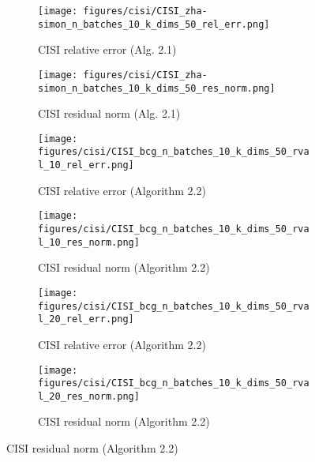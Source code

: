 
\begin{figure}[H]
  \centering
  \begin{subfigure}[b]{0.48\textwidth}
    \centering
    \texttt{[image: figures/cisi/CISI\_zha-simon\_n\_batches\_10\_k\_dims\_50\_rel\_err.png]}
    \caption{CISI relative error (Alg. 2.1)}
  \end{subfigure}
  \hfill
  \begin{subfigure}[b]{0.48\textwidth}
    \centering
    \texttt{[image: figures/cisi/CISI\_zha-simon\_n\_batches\_10\_k\_dims\_50\_res\_norm.png]}
    \caption{CISI residual norm (Alg. 2.1)}
  \end{subfigure}
  \hfill
  \begin{subfigure}[b]{0.48\textwidth}
    \centering
    \texttt{[image: figures/cisi/CISI\_bcg\_n\_batches\_10\_k\_dims\_50\_rval\_10\_rel\_err.png]}
    \caption{CISI relative error (Algorithm 2.2)}
  \end{subfigure}
  \hfill
  \begin{subfigure}[b]{0.48\textwidth}
    \centering
    \texttt{[image: figures/cisi/CISI\_bcg\_n\_batches\_10\_k\_dims\_50\_rval\_10\_res\_norm.png]}
    \caption{CISI residual norm (Algorithm 2.2)}
  \end{subfigure}
  \hfill
  \begin{subfigure}[b]{0.48\textwidth}
    \centering
    \texttt{[image: figures/cisi/CISI\_bcg\_n\_batches\_10\_k\_dims\_50\_rval\_20\_rel\_err.png]}
    \caption{CISI relative error (Algorithm 2.2)}
  \end{subfigure}
  \hfill
  \begin{subfigure}[b]{0.48\textwidth}
    \centering
    \texttt{[image: figures/cisi/CISI\_bcg\_n\_batches\_10\_k\_dims\_50\_rval\_20\_res\_norm.png]}
    \caption{CISI residual norm (Algorithm 2.2)}
  \end{subfigure}
\end{figure}


